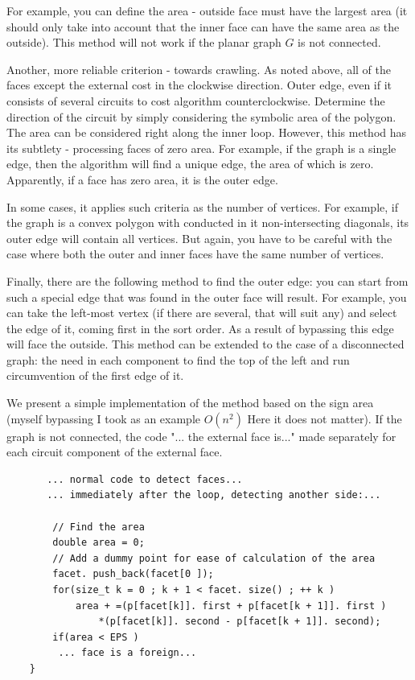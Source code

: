 For example, you can define the area - outside face must have the largest area (it should only take into account that the inner face can have the same area as the outside). This method will not work if the planar graph $G$ is not connected.

Another, more reliable criterion - towards crawling. As noted above, all of the faces except the external cost in the clockwise direction. Outer edge, even if it consists of several circuits to cost algorithm counterclockwise. Determine the direction of the circuit by simply considering the symbolic area of the polygon. The area can be considered right along the inner loop. However, this method has its subtlety - processing faces of zero area. For example, if the graph is a single edge, then the algorithm will find a unique edge, the area of ​​which is zero. Apparently, if a face has zero area, it is the outer edge.

In some cases, it applies such criteria as the number of vertices. For example, if the graph is a convex polygon with conducted in it non-intersecting diagonals, its outer edge will contain all vertices. But again, you have to be careful with the case where both the outer and inner faces have the same number of vertices.

Finally, there are the following method to find the outer edge: you can start from such a special edge that was found in the outer face will result. For example, you can take the left-most vertex (if there are several, that will suit any) and select the edge of it, coming first in the sort order. As a result of bypassing this edge will face the outside. This method can be extended to the case of a disconnected graph: the need in each component to find the top of the left and run circumvention of the first edge of it.

We present a simple implementation of the method based on the sign area (myself bypassing I took as an example $O (n ^ 2)$ Here it does not matter). If the graph is not connected, the code "... the external face is..." made separately for each circuit component of the external face.

\begin{verbatim}
       ... normal code to detect faces...
       ... immediately after the loop, detecting another side:...
         
        // Find the area
        double area = 0;
        // Add a dummy point for ease of calculation of the area
        facet. push_back(facet[0 ]);
        for(size_t k = 0 ; k + 1 < facet. size() ; ++ k )
            area + =(p[facet[k]]. first + p[facet[k + 1]]. first )
                *(p[facet[k]]. second - p[facet[k + 1]]. second);
        if(area < EPS )
         ... face is a foreign...
    } 
\end{verbatim}
